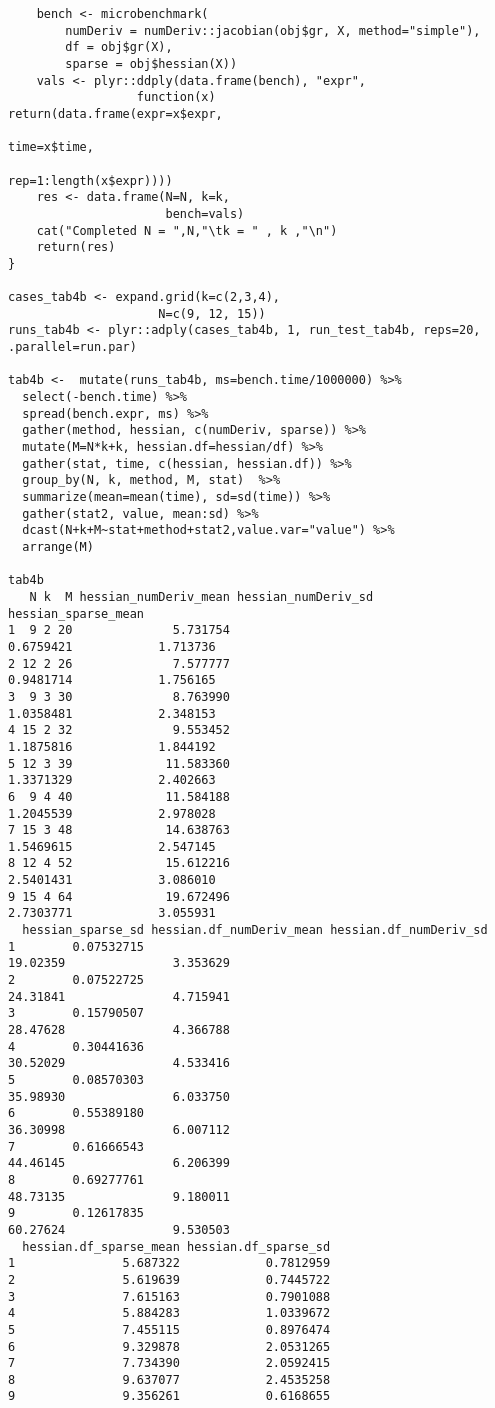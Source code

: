 \documentclass{article}
\newenvironment{revQuote}{\itshape}{\vspace{\baselineskip}}
\begin{document}
\begin{enumerate}
\begin{revQuote}
\begin{verbatim}
    bench <- microbenchmark(
        numDeriv = numDeriv::jacobian(obj$gr, X, method="simple"), 
        df = obj$gr(X),
        sparse = obj$hessian(X))
    vals <- plyr::ddply(data.frame(bench), "expr",
                  function(x)
return(data.frame(expr=x$expr,
                                               
time=x$time,
                                               
rep=1:length(x$expr))))
    res <- data.frame(N=N, k=k,
                      bench=vals)
    cat("Completed N = ",N,"\tk = " , k ,"\n")
    return(res)
}

cases_tab4b <- expand.grid(k=c(2,3,4),
                     N=c(9, 12, 15))
runs_tab4b <- plyr::adply(cases_tab4b, 1, run_test_tab4b, reps=20,
.parallel=run.par)

tab4b <-  mutate(runs_tab4b, ms=bench.time/1000000) %>%
  select(-bench.time) %>%
  spread(bench.expr, ms) %>%
  gather(method, hessian, c(numDeriv, sparse)) %>%
  mutate(M=N*k+k, hessian.df=hessian/df) %>%
  gather(stat, time, c(hessian, hessian.df)) %>%
  group_by(N, k, method, M, stat)  %>%
  summarize(mean=mean(time), sd=sd(time)) %>%
  gather(stat2, value, mean:sd) %>%
  dcast(N+k+M~stat+method+stat2,value.var="value") %>%
  arrange(M)

tab4b 
   N k  M hessian_numDeriv_mean hessian_numDeriv_sd hessian_sparse_mean
1  9 2 20              5.731754          
0.6759421            1.713736
2 12 2 26              7.577777          
0.9481714            1.756165
3  9 3 30              8.763990          
1.0358481            2.348153
4 15 2 32              9.553452          
1.1875816            1.844192
5 12 3 39             11.583360          
1.3371329            2.402663
6  9 4 40             11.584188          
1.2045539            2.978028
7 15 3 48             14.638763          
1.5469615            2.547145
8 12 4 52             15.612216          
2.5401431            3.086010
9 15 4 64             19.672496          
2.7303771            3.055931
  hessian_sparse_sd hessian.df_numDeriv_mean hessian.df_numDeriv_sd
1        0.07532715                
19.02359               3.353629
2        0.07522725                
24.31841               4.715941
3        0.15790507                
28.47628               4.366788
4        0.30441636                
30.52029               4.533416
5        0.08570303                
35.98930               6.033750
6        0.55389180                
36.30998               6.007112
7        0.61666543                
44.46145               6.206399
8        0.69277761                
48.73135               9.180011
9        0.12617835                
60.27624               9.530503
  hessian.df_sparse_mean hessian.df_sparse_sd
1               5.687322            0.7812959
2               5.619639            0.7445722
3               7.615163            0.7901088
4               5.884283            1.0339672
5               7.455115            0.8976474
6               9.329878            2.0531265
7               7.734390            2.0592415
8               9.637077            2.4535258
9               9.356261            0.6168655


\end{verbatim}
\end{revQuote}
\end{enumerate}
\end{document}
